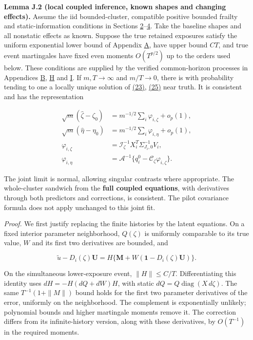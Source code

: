 \documentclass[11pt]{article}
\begin{document}
\label{res:Lemma-J.2}
\textbf{Lemma J.2 (local coupled inference, known shapes and changing effects).} Assume the iid bounded-cluster, compatible positive bounded frailty and static-information conditions in Sections \hyperref[sec:2]{2}--\hyperref[sec:4]{4}. Take the baseline shapes and all nonstatic effects as known. Suppose the true retained exposures satisfy the uniform exponential lower bound of Appendix \hyperref[sec:A]{A}, have upper bound \(CT\), and true event martingales have fixed even moments \(O(T^{p/2})\) up to the orders used below. These conditions are supplied by the verified common-horizon processes in Appendices \hyperref[sec:B]{B}, \hyperref[sec:H]{H} and \hyperref[sec:I]{I}. If \(m,T\to\infty\) and \(m/T\to0\), there is with probability tending to one a locally unique solution of \hyperref[eq:23]{(23)}, \hyperref[eq:25]{(25)} near truth. It is consistent and has the representation

\begin{equation*}
\begin{aligned}
\sqrt m(\widehat\zeta-\zeta_0)&=m^{-1/2}\sum_i\varphi_{i,\zeta}+o_p(1),\\
\sqrt m(\widehat\eta-\eta_0)&=m^{-1/2}\sum_i\varphi_{i,\eta}+o_p(1),\\
\varphi_{i,\zeta}&=\mathcal I_\zeta^{-1}X_i^T\Sigma_{J_i,0}^{-1}V_i,\\
\varphi_{i,\eta}&=\mathcal A^{-1}\{q_i^0-\mathcal C_\zeta\varphi_{i,\zeta}\}.
\end{aligned}\tag{J.14}\label{eq:J.14}
\end{equation*}

The joint limit is normal, allowing singular contrasts where appropriate. The whole-cluster sandwich from the \textbf{full coupled equations}, with derivatives through both predictors and corrections, is consistent. The pilot covariance formula does not apply unchanged to this joint fit.

\textit{Proof.} We first justify replacing the finite histories by the latent equations. On a fixed interior parameter neighborhood, \(Q(\zeta)\) is uniformly comparable to its true value, \(W\) and its first two derivatives are bounded, and

\begin{equation*}
\widetilde u-D_i(\zeta)\mathbf U
 =H\{\mathbf M+W(\mathbf1-D_i(\zeta)\mathbf U)\}.
\tag{J.15}\label{eq:J.15}
\end{equation*}

On the simultaneous lower-exposure event, \(\|H\|\leq C/T\). Differentiating this identity uses
\(dH=-H(dQ+dW)H\), with static \(dQ=Q\operatorname{diag}(X\,d\zeta)\). The same \(T^{-1}(1+\|M\|)\) bound holds for the first two parameter derivatives of the error, uniformly on the neighborhood. The complement is exponentially unlikely; polynomial bounds and higher martingale moments remove it. The correction differs from its infinite-history version, along with these derivatives, by \(O(T^{-1})\) in the required moments.
\end{document}
